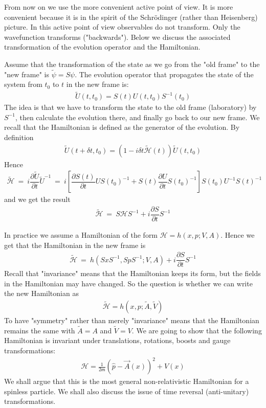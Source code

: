 \documentclass[onecolumn,fleqn, 11pt]{revtex4}
\newcommand{\mass}{\mathsf{m}}
\newcommand{\beq}{\begin{eqnarray}}
\newcommand{\eeq}{\end{eqnarray}}
\begin{document}
From now on we use the more convenient 
active point of view. It is more convenient 
because it is in the spirit of the Schr\"{o}dinger 
(rather than Heisenberg) picture. In this 
active point of view observables do not transform. 
Only the wavefunction transforms ("backwards").     
Below we discuss the associated 
transformation of the evolution operator 
and the Hamiltonian. 

Assume that the transformation of the state 
as we go from the "old frame" to the "new frame" is 
$\tilde{\psi}=S\psi$. The evolution operator that 
propagates the state of the system from $t_{0}$ to $t$ 
in the new frame is: 
\beq
\tilde{U}(t,t_{0})=S(t)U(t,t_{0})S^{-1}(t_{0})
\eeq
The idea is that we have to transform the state 
to the old frame (laboratory) by $S^{-1}$, 
then calculate the evolution there, 
and finally go back to our new frame.
We recall that the Hamiltonian is defined as the 
generator of the evolution. By definition 
\beq
\tilde{U}(t+\delta t,t_{0})=(1-i\delta t \tilde{\mathcal{H}}(t) ) \tilde{U}(t,t_{0})
\eeq
Hence 
\beq
\tilde{\mathcal{H}} \ = \ i\dfrac{\partial \tilde{U}}{\partial t}\tilde{U}^{-1} 
\ = \ 
i\left[ 
\dfrac{\partial S\left( t\right) }{\partial t}US\left( t_{0}\right) ^{-1}
+S(t) \dfrac{\partial U}{\partial t} S(t_{0})^{-1} \right] 
S(t_{0}) U^{-1}S(t)^{-1}
\eeq
and we get the result
\beq
\tilde{\mathcal{H}} \ = \ S \mathcal{H} S^{-1} + i \dfrac{\partial S}{\partial t} S^{-1}
\eeq



In practice we assume a Hamiltonian of the form $\mathcal{H}=h(x,p;V,A)$.  
Hence we get that the Hamiltonian in the new frame is 
\beq
\tilde{\mathcal{H}} \ = \  h(SxS^{-1},SpS^{-1};V,A)  + i \dfrac{\partial S}{\partial t} S^{-1}
\eeq
Recall that "invariance" means that the Hamiltonian 
keeps its form, but the fields in the 
Hamiltonian may have changed. So the question is 
whether we can write the new Hamiltonian as   
\beq
\tilde{\mathcal{H}} = h(x,p;\tilde{A},\tilde{V})
\eeq
To have "symmetry" rather than merely "invariance" 
means that the Hamiltonian remains the same 
with $\tilde{A}=A$ and $\tilde{V}=V$.    
We are going to show that the following Hamiltonian 
is invariant under translations, rotations, boosts and gauge transformations:
\beq
\mathcal{H} = \frac{1}{2\mass} \left( \hat{p}-\vec{A}(x) \right)^{2}+ V(x)
\eeq
We shall argue that this is the most general 
non-relativistic Hamiltonian for a spinless particle.
We shall also discuss the issue of time reversal 
(anti-unitary) transformations.     
\end{document}
